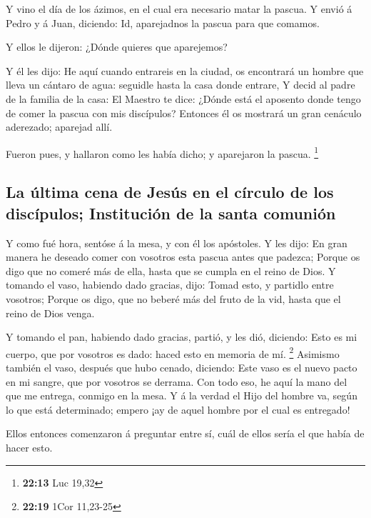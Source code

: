  Y vino el día de los ázimos, en el cual era necesario matar
la pascua.  Y envió á Pedro y á Juan, diciendo: Id,
aparejadnos la pascua para que comamos.

 Y ellos le dijeron: ¿Dónde quieres que aparejemos?

 Y él les dijo: He aquí cuando entrareis en la ciudad, os
encontrará un hombre que lleva un cántaro de agua: seguidle hasta la
casa donde entrare,  Y decid al padre de la familia de la
casa: El Maestro te dice: ¿Dónde está el aposento donde tengo de comer
la pascua con mis discípulos?  Entonces él os mostrará un
gran cenáculo aderezado; aparejad allí.

 Fueron pues, y hallaron como les había dicho; y aparejaron
la pascua. \footnote{\textbf{22:13} Luc 19,32}

\hypertarget{la-uxfaltima-cena-de-jesuxfas-en-el-cuxedrculo-de-los-discuxedpulos-instituciuxf3n-de-la-santa-comuniuxf3n}{%
\subsection{La última cena de Jesús en el círculo de los discípulos;
Institución de la santa
comunión}\label{la-uxfaltima-cena-de-jesuxfas-en-el-cuxedrculo-de-los-discuxedpulos-instituciuxf3n-de-la-santa-comuniuxf3n}}

 Y como fué hora, sentóse á la mesa, y con él los
apóstoles.  Y les dijo: En gran manera he deseado comer con
vosotros esta pascua antes que padezca;  Porque os digo que
no comeré más de ella, hasta que se cumpla en el reino de Dios.
 Y tomando el vaso, habiendo dado gracias, dijo: Tomad
esto, y partidlo entre vosotros;  Porque os digo, que no
beberé más del fruto de la vid, hasta que el reino de Dios venga.

 Y tomando el pan, habiendo dado gracias, partió, y les
dió, diciendo: Esto es mi cuerpo, que por vosotros es dado: haced esto
en memoria de mí. \footnote{\textbf{22:19} 1Cor 11,23-25} 
Asimismo también el vaso, después que hubo cenado, diciendo: Este vaso
es el nuevo pacto en mi sangre, que por vosotros se derrama.
 Con todo eso, he aquí la mano del que me entrega, conmigo
en la mesa.  Y á la verdad el Hijo del hombre va, según lo
que está determinado; empero ¡ay de aquel hombre por el cual es
entregado!

 Ellos entonces comenzaron á preguntar entre sí, cuál de
ellos sería el que había de hacer esto.

